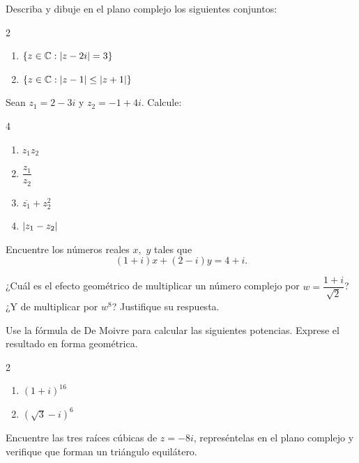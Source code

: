 \begin{prob}
Describa y dibuje en el plano complejo los siguientes conjuntos:
\begin{multicols}{2}
\begin{enumerate}[$a)$]
\item $\left\lbrace z\in\mathbb{C} : \left\vert z-2i\right\vert=3 \right\rbrace$
\item $\left\lbrace z\in\mathbb{C} : \left\vert z-1\right\vert\leq\left\vert z+1\right\vert \right\rbrace$
\end{enumerate}
\end{multicols}
\end{prob}

\begin{prob}
Sean $z_1=2-3i$ y $z_2=-1+4i$. Calcule:
\begin{multicols}{4}
\begin{enumerate}[$a)$]
\item $z_1 z_2$
\item $\dfrac{z_1}{z_2}$
\item $\overline{z_1}+z_2^2$
\item $\left\vert z_1-z_2\right\vert$
\end{enumerate}
\end{multicols}
\end{prob}

\begin{prob}
Encuentre los números reales $x,$ $y$ tales que
\[
(1+i)x+(2-i)y=4+i.
\]
\end{prob}

\begin{prob}
¿Cuál es el efecto geométrico de multiplicar un número complejo por $w=\dfrac{1+i}{\sqrt{2}}$? ¿Y de multiplicar por $w^8$? Justifique su respuesta.
\end{prob}

\begin{prob}
Use la fórmula de De Moivre para calcular las siguientes potencias. Exprese el resultado en forma geométrica.
\begin{multicols}{2}
\begin{enumerate}[$a)$]
\item $(1+i)^{16}$
\item $\left(\sqrt{3}-i\right)^{6}$
\end{enumerate}
\end{multicols}
\end{prob}

\begin{prob}
Encuentre las tres raíces cúbicas de $z=-8i$, represéntelas en el plano complejo y verifique que forman un triángulo equilátero.
\end{prob}

